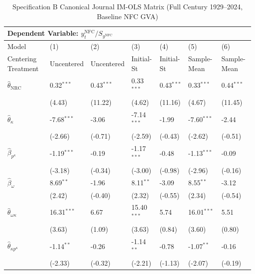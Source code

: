 \begin{landscape}
\begin{table}[H]
\centering
\caption{Specification B Canonical Journal IM-OLS Matrix (Full Century 1929--2024, Baseline NFC GVA)}
\label{tab:specB_primary}
\small
\begin{tabular}{p{5.0cm}p{1.8cm}p{1.8cm}p{1.8cm}p{1.8cm}p{1.8cm}p{1.8cm}}
\toprule
\multicolumn{7}{l}{\textbf{Dependent Variable: $y_t^{\text{NFC}} / S_{y^{\text{NFC}}}$}} \\
\midrule
Model & (1) & (2) & (3) & (4) & (5) & (6)  \\
Centering Treatment & Uncentered & Uncentered & Initial-St & Initial-St & Sample-Mean & Sample-Mean  \\
\midrule
$\hat{\theta}_{\text{NRC}}$ & 0.32$^{***}$ & 0.43$^{***}$ & 0.33$^{***}$ & 0.43$^{***}$ & 0.33$^{***}$ & 0.44$^{***}$  \\
 & {\scriptsize (4.43)} & {\scriptsize (11.22)} & {\scriptsize (4.62)} & {\scriptsize (11.16)} & {\scriptsize (4.67)} & {\scriptsize (11.45)}  \\
$\hat{\theta}_{\kappa}$ & -7.68$^{***}$ & -3.06 & -7.14$^{***}$ & -1.99 & -7.60$^{***}$ & -2.44  \\
 & {\scriptsize (-2.66)} & {\scriptsize (-0.71)} & {\scriptsize (-2.59)} & {\scriptsize (-0.43)} & {\scriptsize (-2.62)} & {\scriptsize (-0.51)}  \\
$\hat{\beta}_{p^{\kappa}}$ & -1.19$^{***}$ & -0.19 & -1.17$^{***}$ & -0.48 & -1.13$^{***}$ & -0.09  \\
 & {\scriptsize (-3.18)} & {\scriptsize (-0.34)} & {\scriptsize (-3.00)} & {\scriptsize (-0.98)} & {\scriptsize (-2.96)} & {\scriptsize (-0.16)}  \\
$\hat{\beta}_{\omega}$ & 8.69$^{**}$ & -1.96 & 8.11$^{**}$ & -3.09 & 8.55$^{**}$ & -3.12  \\
 & {\scriptsize (2.42)} & {\scriptsize (-0.40)} & {\scriptsize (2.32)} & {\scriptsize (-0.55)} & {\scriptsize (2.34)} & {\scriptsize (-0.54)}  \\
$\hat{\theta}_{\omega \kappa}$ & 16.31$^{***}$ & 6.67 & 15.40$^{***}$ & 5.74 & 16.01$^{***}$ & 5.51  \\
 & {\scriptsize (3.63)} & {\scriptsize (1.09)} & {\scriptsize (3.63)} & {\scriptsize (0.84)} & {\scriptsize (3.60)} & {\scriptsize (0.80)}  \\
$\hat{\theta}_{\kappa p^{\kappa}}$ & -1.14$^{**}$ & -0.26 & -1.14$^{**}$ & -0.78 & -1.07$^{**}$ & -0.16  \\
 & {\scriptsize (-2.33)} & {\scriptsize (-0.32)} & {\scriptsize (-2.21)} & {\scriptsize (-1.13)} & {\scriptsize (-2.07)} & {\scriptsize (-0.19)}  \\

\end{tabular}
\end{table}
\end{landscape}
